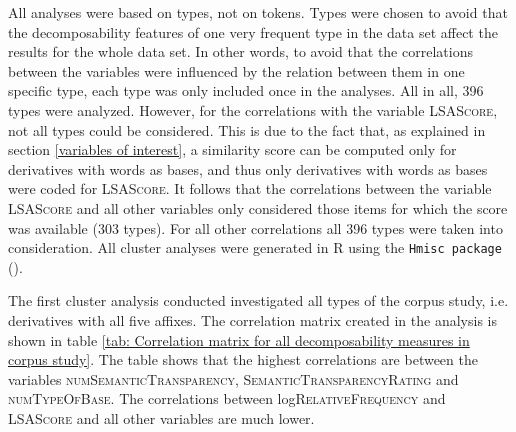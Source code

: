 All analyses were based on types, not on tokens. Types were chosen to avoid that the decomposability features of one very frequent type in the data set affect the results for the whole data set. In other words, to avoid that the correlations between the variables were influenced by the relation between them in one specific type, each type was only included once in the analyses. 
All in all, 396 types were analyzed. However, for the correlations with the variable \textsc{LSAScore}, not all types could be considered. This is due to the fact that, as explained in section \ref{variables of interest}, a similarity score can be computed only for derivatives with words as bases, and thus only derivatives with words as bases were coded for \textsc{LSAScore}. It follows that the correlations between the variable \textsc{LSAScore} and all other variables only considered those items for which the score was available (303 types). For all other correlations all 396 types were taken into consideration. 
All cluster analyses were generated in R using the \texttt{Hmisc package} (\citealt{Harrell.2017}).

The first cluster analysis conducted investigated all types of the corpus study, i.e. derivatives with all five affixes. The correlation matrix created in the analysis is shown in table \ref{tab: Correlation matrix for all decomposability measures in corpus study}. The table shows that the highest correlations are between the variables \textsc{numSemanticTransparency}, \textsc{SemanticTransparencyRating} and \textsc{numTypeOfBase}. The correlations between log\textsc{RelativeFrequency} and \textsc{LSAScore} and all other variables are much lower. 



